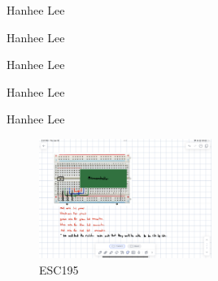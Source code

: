 \documentclass{article}
\begin{document}
\begin{definition}
    
\end{definition}

\begin{theorem}
    Hanhee Lee
\end{theorem}

\begin{derivation}
    Hanhee Lee
\end{derivation}

\begin{intuition}
    Hanhee Lee
\end{intuition}

\begin{warning}
    Hanhee Lee
\end{warning}

\begin{summary}
    Hanhee Lee
\end{summary}

\begin{figure}[H]
    \centering
    \includegraphics[width=0.5\textwidth]{00_Images/diagram_circuit.png}
    \caption{ESC195}
\end{figure}
\end{document}
